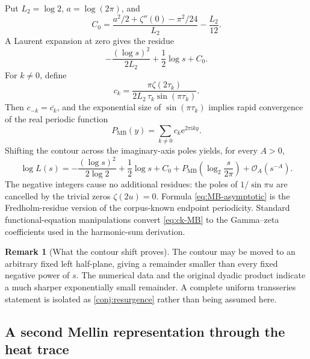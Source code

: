 \documentclass[11pt,oneside]{article}
\theoremstyle{definition}
\newtheorem{remark}[theorem]{Remark}
\newcommand{\e}{\mathrm e}
\newcommand{\ii}{\mathrm i}
\newcommand{\bigO}{\mathcal O}
\begin{document}
Put \(L_2=\log2\), \(a=\log(2\pi)\), and
\begin{equation}
 C_0=\frac{a^2/2+\zeta''(0)-\pi^2/24}{L_2}-\frac{L_2}{12}.
 \label{eq:C0}
\end{equation}
A Laurent expansion at zero gives the residue
\begin{equation}
 -\frac{(\log s)^2}{2L_2}+\frac12\log s+C_0.
 \label{eq:zero-residue}
\end{equation}
For \(k\ne0\), define
\begin{equation}
 c_k=\frac{\pi\zeta(2\tau_k)}
 {2L_2\,\tau_k\sin(\pi\tau_k)}.
 \label{eq:ck-MB}
\end{equation}
Then \(c_{-k}=\overline{c_k}\), and the exponential size of
\(\sin(\pi\tau_k)\) implies rapid convergence of the real periodic function
\begin{equation}
 P_{\mathrm{MB}}(y)=\sum_{k\ne0}c_k\e^{2\pi\ii ky}.
 \label{eq:P-MB}
\end{equation}
Shifting the contour across the imaginary-axis poles yields, for every \(A>0\),
\begin{equation}
 \boxed{\quad
 \log L(s)=-\frac{(\log s)^2}{2\log2}+\frac12\log s+C_0
 +P_{\mathrm{MB}}\!\left(\log_2\frac{s}{2\pi}\right)
 +\bigO_A(s^{-A}).
 \quad}
 \label{eq:MB-asymptotic}
\end{equation}
The negative integers cause no additional residues: the poles of
\(1/\sin\pi u\) are cancelled by the trivial zeros \(\zeta(2u)=0\).  Formula
\eqref{eq:MB-asymptotic} is the Fredholm-residue version of the corpus-known endpoint
periodicity.  Standard functional-equation manipulations convert
\eqref{eq:ck-MB} to the Gamma--zeta coefficients used in the harmonic-sum derivation.

\begin{remark}[What the contour shift proves]
The contour may be moved to an arbitrary fixed left half-plane, giving a remainder
smaller than every fixed negative power of \(s\).  The numerical data and the original
dyadic product indicate a much sharper exponentially small remainder.  A complete
uniform transseries statement is isolated as \cref{conj:resurgence} rather than being
assumed here.
\end{remark}

\subsection{A second Mellin representation through the heat trace}
\end{document}
